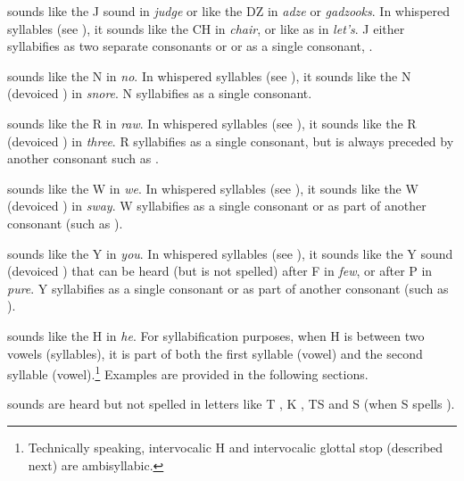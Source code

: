 \begin{description}[font=\normalfont]
\item[J] sounds like the J  sound in \textit{judge} or like the DZ  in \textit{adze}  or \textit{gadzooks}. In whispered syllables (see ), it sounds like the CH  in \textit{chair}, or like  as in \textit{let’s}. J either syllabifies as two separate consonants  or  or as a single consonant, .

\item[N] sounds like the N  in \textit{no}. In whispered syllables (see ), it sounds like the N (devoiced ) in \textit{snore}. N syllabifies as a single consonant.

\item[R] sounds like the R  in \textit{raw}. In whispered syllables (see ), it sounds like the R (devoiced ) in \textit{three}. R syllabifies as a single consonant, but is always preceded by another consonant such as .

\item[W] sounds like the W  in \textit{we}. In whispered syllables (see ), it sounds like the W (devoiced ) in \textit{sway}. W syllabifies as a single consonant  or as part of another consonant (such as ).

\item[Y] sounds like the Y  in \textit{you}. In whispered syllables (see ), it sounds like the Y sound (devoiced ) that can be heard (but is not spelled) after F in \textit{few}, or after P in \textit{pure}. Y syllabifies as a single consonant  or as part of another consonant (such as ).

\item[H] sounds like the H in \textit{he}. For syllabification purposes, when H is between two vowels (syllables), it is part of both the first syllable (vowel) and the second syllable (vowel).\footnote{Technically speaking, intervocalic H and intervocalic glottal stop (described next) are ambisyllabic.} Examples are provided in the following sections.

\item[H] sounds are heard but not spelled in letters like T , K , TS  and S (when S spells ).


\end{description}

